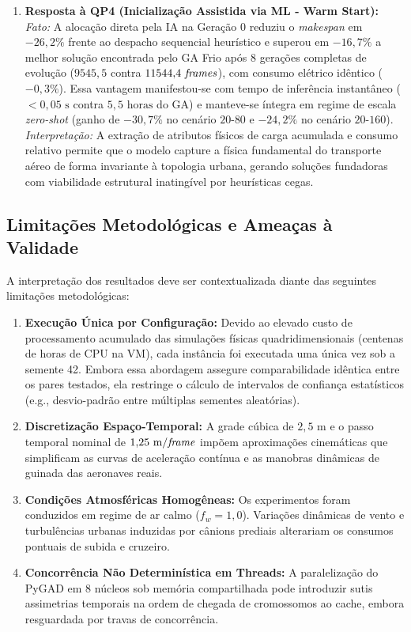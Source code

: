 \begin{enumerate}
    \item \textbf{Resposta à QP4 (Inicialização Assistida via ML - Warm Start):}  
    \textit{Fato:} A alocação direta pela IA na Geração 0 reduziu o \textit{makespan} em $-26{,}2\%$ frente ao despacho sequencial heurístico e superou em $-16{,}7\%$ a melhor solução encontrada pelo GA Frio após 8 gerações completas de evolução ($9545{,}5$ contra $11544{,}4\text{ \textit{frames}}$), com consumo elétrico idêntico ($-0{,}3\%$). Essa vantagem manifestou-se com tempo de inferência instantâneo ($<0{,}05\text{ s}$ contra $5{,}5\text{ horas}$ do GA) e manteve-se íntegra em regime de escala \textit{zero-shot} (ganho de $-30{,}7\%$ no cenário $20\text{-}80$ e $-24{,}2\%$ no cenário $20\text{-}160$).  
    \textit{Interpretação:} A extração de atributos físicos de carga acumulada e consumo relativo permite que o modelo capture a física fundamental do transporte aéreo de forma invariante à topologia urbana, gerando soluções fundadoras com viabilidade estrutural inatingível por heurísticas cegas.
\end{enumerate}

\subsection{Limitações Metodológicas e Ameaças à Validade}

A interpretação dos resultados deve ser contextualizada diante das seguintes limitações metodológicas:
\begin{enumerate}
    \item \textbf{Execução Única por Configuração:} Devido ao elevado custo de processamento acumulado das simulações físicas quadridimensionais (centenas de horas de CPU na VM), cada instância foi executada uma única vez sob a semente 42. Embora essa abordagem assegure comparabilidade idêntica entre os pares testados, ela restringe o cálculo de intervalos de confiança estatísticos (e.g., desvio-padrão entre múltiplas sementes aleatórias).
    \item \textbf{Discretização Espaço-Temporal:} A grade cúbica de $2{,}5\text{ m}$ e o passo temporal nominal de $1{,}25\text{ m/\textit{frame}}$ impõem aproximações cinemáticas que simplificam as curvas de aceleração contínua e as manobras dinâmicas de guinada das aeronaves reais.
    \item \textbf{Condições Atmosféricas Homogêneas:} Os experimentos foram conduzidos em regime de ar calmo ($f_w = 1{,}0$). Variações dinâmicas de vento e turbulências urbanas induzidas por cânions prediais alterariam os consumos pontuais de subida e cruzeiro.
    \item \textbf{Concorrência Não Determinística em Threads:} A paralelização do PyGAD em 8 núcleos sob memória compartilhada pode introduzir sutis assimetrias temporais na ordem de chegada de cromossomos ao cache, embora resguardada por travas de concorrência.
\end{enumerate}


